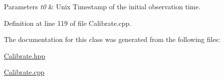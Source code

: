 \begin{DoxyParams}{Parameters}
{\em t0} & Unix Timestamp of the initial observation time. \\
\hline
\end{DoxyParams}


Definition at line 119 of file Calibrate.\-cpp.



The documentation for this class was generated from the following files\-:\begin{DoxyCompactItemize}
\item 
\hyperlink{_calibrate_8hpp}{Calibrate.\-hpp}\item 
\hyperlink{_calibrate_8cpp}{Calibrate.\-cpp}\end{DoxyCompactItemize}
